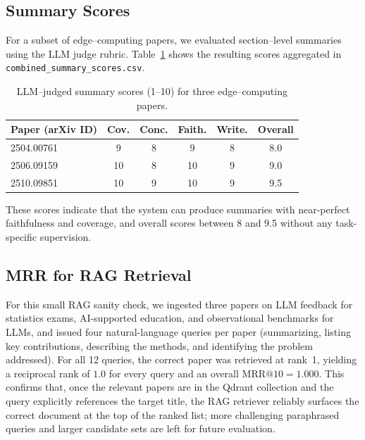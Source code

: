 \documentclass{article}
\begin{document}
\subsection{Summary Scores}

For a subset of edge--computing papers, we evaluated section--level summaries using the LLM judge rubric.
Table~\ref{tab:summary} shows the resulting scores aggregated in \texttt{combined\_summary\_scores.csv}.

\begin{table}[h]
\centering
\begin{tabular}{l|c|c|c|c|c}
\textbf{Paper (arXiv ID)} & \textbf{Cov.} & \textbf{Conc.} & \textbf{Faith.} & \textbf{Write.} & \textbf{Overall} \\\hline
2504.00761 & 9  & 8 & 9  & 8 & 8.0  \\
2506.09159 & 10 & 8 & 10 & 9 & 9.0  \\
2510.09851 & 10 & 9 & 10 & 9 & 9.5  \\
\end{tabular}
\caption{\label{tab:summary}LLM--judged summary scores (1--10) for three edge--computing papers.}
\end{table}

These scores indicate that the system can produce summaries with near-perfect faithfulness and coverage, and overall scores between 8 and 9.5 without any task-specific supervision.

\subsection{MRR for RAG Retrieval}
For this small RAG sanity check, we ingested three papers on LLM feedback for statistics exams, AI-supported education, and observational benchmarks for LLMs, and issued four natural-language queries per paper (summarizing, listing key contributions, describing the methods, and identifying the problem addressed). For all 12 queries, the correct paper was retrieved at rank~1, yielding a reciprocal rank of $1.0$ for every query and an overall $\mathrm{MRR@10} = 1.000$. This confirms that, once the relevant papers are in the Qdrant collection and the query explicitly references the target title, the RAG retriever reliably surfaces the correct document at the top of the ranked list; more challenging paraphrased queries and larger candidate sets are left for future evaluation.
\end{document}
